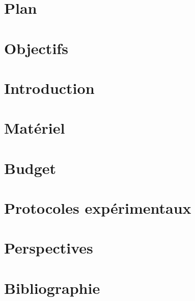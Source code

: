 \documentclass{article}
\begin{document}


\section*{Plan}


\section*{Objectifs}


\section*{Introduction}


\section*{Matériel}


\section*{Budget}


\section*{Protocoles expérimentaux}


\section*{Perspectives}


\section*{Bibliographie}
\end{document}
